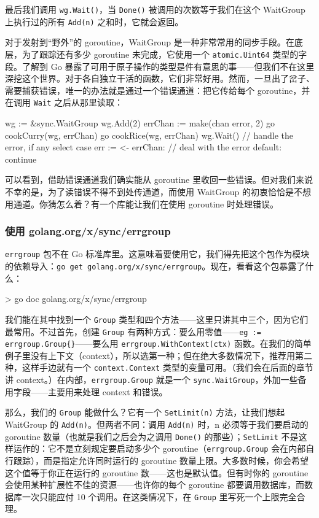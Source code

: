 最后我们调用 \texttt{wg.Wait()}，当 \texttt{Done()} 被调用的次数等于我们在这个 WaitGroup 上执行过的所有 \texttt{Add(n)} 之和时，它就会返回。

对于发射到``野外''的 goroutine，WaitGroup 是一种非常常用的同步手段。在底层，为了跟踪还有多少 goroutine 未完成，它使用一个 \texttt{atomic.Uint64} 类型的字段。了解到 Go 暴露了可用于原子操作的类型是件有意思的事——但我们不在这里深挖这个世界。对于各自独立干活的函数，它们非常好用。然而，一旦出了岔子、需要捕获错误，唯一的办法就是通过一个错误通道：把它传给每个 goroutine，并在调用 \texttt{Wait} 之后从那里读取：

\begin{gocode}[]
wg := &sync.WaitGroup{}
wg.Add(2)
errChan := make(chan error, 2)
go cookCurry(wg, errChan)
go cookRice(wg, errChan)
wg.Wait()
// handle the error, if any
select {
case err := <- errChan:
    // deal with the error
default:
    continue
}
\end{gocode}

可以看到，借助错误通道我们确实能从 goroutine 里收回一些错误。但对我们来说不幸的是，为了读错误不得不到处传通道，而使用 WaitGroup 的初衷恰恰是不想用通道。你猜怎么着？有一个库能让我们在使用 goroutine 时处理错误。

\subsubsection*{使用 golang.org/x/sync/errgroup}

\texttt{errgroup} 包不在 Go 标准库里。这意味着要使用它，我们得先把这个包作为模块的依赖导入：\texttt{go get golang.org/x/sync/errgroup}。现在，看看这个包暴露了什么：

\begin{shellcode}[]
> go doc golang.org/x/sync/errgroup
\end{shellcode}

我们能在其中找到一个 \texttt{Group} 类型和四个方法——这里只讲其中三个，因为它们最常用。不过首先，创建 \texttt{Group} 有两种方式：要么用零值——\texttt{eg := errgroup.Group\{\}}——要么用 \texttt{errgroup.WithContext(ctx)} 函数。在我们的简单例子里没有上下文（context），所以选第一种；但在绝大多数情况下，推荐用第二种，这样手边就有一个 \texttt{context.Context} 类型的变量可用。（我们会在后面的章节讲 context。）在内部，\texttt{errgroup.Group} 就是一个 \texttt{sync.WaitGroup}，外加一些备用字段——主要用来处理 context 和错误。

那么，我们的 \texttt{Group} 能做什么？它有一个 \texttt{SetLimit(n)} 方法，让我们想起 WaitGroup 的 \texttt{Add(n)}。但两者不同：调用 \texttt{Add(n)} 时，n 必须等于我们要启动的 goroutine 数量（也就是我们之后会为之调用 \texttt{Done()} 的那些）；\texttt{SetLimit} 不是这样运作的：它不是立刻规定要启动多少个 goroutine（\texttt{errgroup.Group} 会在内部自行跟踪），而是指定允许同时运行的 goroutine 数量上限。大多数时候，你会希望这个值等于你正在运行的 goroutine 数——这也是默认值。但有时你的 goroutine 会使用某种扩展性不佳的资源——也许你的每个 goroutine 都要调用数据库，而数据库一次只能应付 10 个调用。在这类情况下，在 \texttt{Group} 里写死一个上限完全合理。


